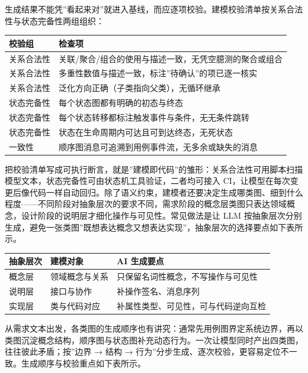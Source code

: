 \documentclass[12pt,a4paper,twoside,openany]{ctexbook}
\numberwithin{figure}{chapter}
\numberwithin{table}{chapter}
\newcounter{none}
\begin{document}
生成结果不能凭''看起来对''就进入基线，而应逐项校验。建模校验清单按关系合法性与状态完备性两组组织：

{\def\LTcaptype{none} %
\begin{longtable}[]{@{}ll@{}}
\toprule\noalign{}
校验组 & 检查项 \\
\midrule\noalign{}
\endhead
\bottomrule\noalign{}
\endlastfoot
关系合法性 & 关联/聚合/组合的使用与描述一致，无凭空臆测的聚合或组合 \\
关系合法性 & 多重性数值与描述一致，标注''待确认''的项已逐一核实 \\
关系合法性 & 泛化方向正确（子类指向父类），无循环继承 \\
状态完备性 & 每个状态图都有明确的初态与终态 \\
状态完备性 & 每个状态转移都标注触发事件与条件，无无条件跳转 \\
状态完备性 & 状态在生命周期内可达且可到达终态，无死状态 \\
一致性 & 顺序图消息可追溯到用例事件流，无多余或缺失的消息 \\
\end{longtable}
}

把校验清单写成可执行断言，就是''建模即代码''的雏形：关系合法性可用脚本扫描模型文本，状态完备性可由状态机工具验证，二者均可接入
CI，让模型在每次变更后像代码一样自动回归。除了语义约束，建模者还要决定生成哪类图、细到什么程度------不同阶段对抽象层次的要求不同，需求阶段的概念层类图只表达领域概念，设计阶段的说明层才细化操作与可见性。常见做法是让
LLM
按抽象层次分别生成，避免一张类图''既想表达概念又想表达实现''，抽象层次的选择要点如下表所示。

{\def\LTcaptype{none} %
\begin{longtable}[]{@{}lll@{}}
\toprule\noalign{}
抽象层次 & 建模对象 & AI 生成要点 \\
\midrule\noalign{}
\endhead
\bottomrule\noalign{}
\endlastfoot
概念层 & 领域概念与关系 & 只保留名词性概念，不写操作与可见性 \\
说明层 & 接口与协作 & 补操作签名、消息序列 \\
实现层 & 类与代码对应 & 补属性类型、可见性，可与代码逆向互检 \\
\end{longtable}
}

从需求文本出发，各类图的生成顺序也有讲究：通常先用例图界定系统边界，再以类图沉淀概念结构，顺序图与状态图补充动态行为。一次让模型同时产出四类图，往往彼此矛盾；按''边界
→ 结构 →
行为''分步生成、逐次校验，更容易定位不一致。生成顺序与校验重点如下表所示。
\end{document}
